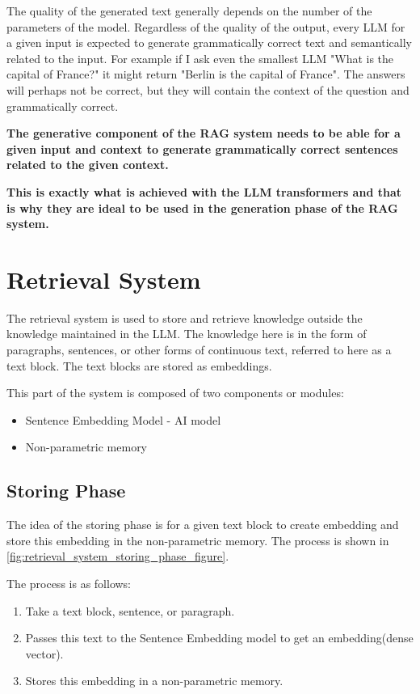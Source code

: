 \documentclass{wseas}
\begin{document}
The quality of the generated text generally depends on the number of the
parameters of the model. Regardless of the quality of the output, every
LLM for a given input is expected to generate grammatically correct text
and semantically related to the input. For example if I ask even the
smallest LLM "What is the capital of France?" it might return "Berlin
is the capital of France". The answers will perhaps not be correct, but
they will contain the context of the question and grammatically correct.

\textbf{The generative component of the RAG system needs to be able for
a given input and context to generate grammatically correct sentences
related to the given context.}

\textbf{This is exactly what is achieved with the LLM transformers and
that is why they are ideal to be used in the generation phase of the RAG
system.}

\section{Retrieval System}

The retrieval system is used to store and retrieve knowledge outside the
knowledge maintained in the LLM. The knowledge here is in the form of
paragraphs, sentences, or other forms of continuous text, referred to
here as a text block. The text blocks are stored as embeddings.

This part of the system is composed of two components or modules:

\begin{itemize}
\item
  Sentence Embedding Model - AI model
\item
  Non-parametric memory
\end{itemize}

\subsection{Storing Phase}

The idea of the storing phase is for a given text block to create
embedding and store this embedding in the non-parametric memory.
The process is shown in \autoref{fig:retrieval_system_storing_phase_figure}.

The process is as follows:
\begin{enumerate}
\item
    Take a text block, sentence, or paragraph.
\item
    Passes this text to the Sentence Embedding model to get an
    embedding(dense vector).
\item
    Stores this embedding in a non-parametric memory.
\end{enumerate}
\end{document}
